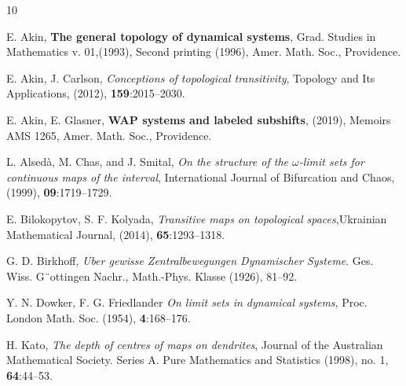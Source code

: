 \documentclass[12pt]{amsart}
\def \om {\omega}
\numberwithin{equation}{section}
\begin{document}
  
\begin{thebibliography}{10}


E. Akin,  {\bfseries The general topology of dynamical systems}, Grad. Studies in
Mathematics v. 01,(1993), Second printing (1996), Amer. Math. Soc., Providence. \vspace{.25cm}
\vspace{.25cm}

%

 E. Akin, J. Carlson, \emph{Conceptions of topological transitivity}, Topology and Its Applications, (2012), \textbf{159}:2015--2030.	
\vspace{.25cm}

E. Akin, E. Glasner, \textbf{WAP systems and labeled subshifts}, (2019),
Memoirs AMS 1265, Amer. Math. Soc., Providence. \vspace{.25cm}

L. Alsed\`{a}, M. Chas, and J. Smital, \emph{On the structure of the $\om$-limit sets for continuous
maps of the interval}, International Journal of Bifurcation and Chaos, (1999), \textbf{09}:1719--1729.
\vspace{.25cm}

E. Bilokopytov, S. F. Kolyada, \emph{Transitive maps on topological spaces},Ukrainian Mathematical Journal, (2014), \textbf{65}:1293--1318.
\vspace{.25cm}

G. D. Birkhoff, \emph{Uber gewisse Zentralbewegungen Dynamischer Systeme}.
Ges. Wiss. G¨ottingen Nachr., Math.-Phys. Klasse (1926), 81--92.
\vspace{.25cm}

Y. N. Dowker, F. G. Friedlander  \emph{On limit sets in dynamical systems},
Proc. London Math. Soc. (1954),  \textbf{4}:168--176.
\vspace{.25cm}

H. Kato, \emph{The depth of centres of maps on dendrites}, Journal of the Australian Mathematical
Society. Series A. Pure Mathematics and Statistics (1998), no. 1, \textbf{64}:44--53.
\vspace{.25cm}


\end{thebibliography}
\end{document}
